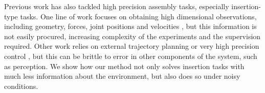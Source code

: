 Previous work has also tackled high precision assembly tasks, especially insertion-type tasks. One line of work focuses on obtaining high dimensional observations, including geometry, forces, joint positions and velocities \citep{li2014usbgelsight, tamar2017hindsightplan, inoue2017deeprlassembly, luo19variableimpedance}, but this information is not easily procured, increasing complexity of the experiments and the supervision required. Other work relies on external trajectory planning or very high precision control \citep{inoue2017deeprlassembly, tamar2017hindsightplan}, but this can be brittle to error in other components of the system, such as perception. We show how our method not only solves insertion tasks with much less information about the environment, but also does so under noisy conditions.